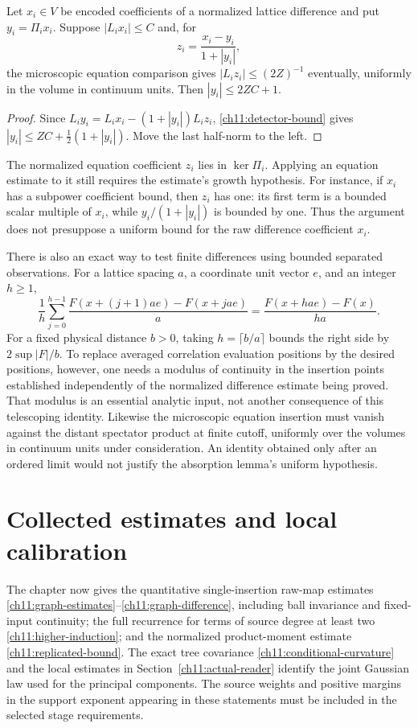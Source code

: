 \begin{lemma}
\label{ch11:absorption}
Let $x_i\in V$ be encoded coefficients of a normalized lattice
difference and put $y_i=\Pi_i x_i$. Suppose $|L_i x_i|\le C$ and,
for
\[
 z_i=\frac{x_i-y_i}{1+|y_i|},
\]
the microscopic equation comparison gives
$|L_i z_i|\le(2Z)^{-1}$ eventually, uniformly in the volume in continuum units.
Then $|y_i|\le2ZC+1$.
\end{lemma}
\begin{proof}
Since $L_i y_i=L_i x_i-(1+|y_i|)L_i z_i$,
\eqref{ch11:detector-bound} gives
$|y_i|\le ZC+\tfrac12(1+|y_i|)$.
Move the last half-norm to the left.
\end{proof}

The normalized equation coefficient $z_i$ lies in $\ker\Pi_i$.
Applying an equation estimate to it still requires the estimate's
growth hypothesis. For instance, if $x_i$ has a subpower coefficient
bound, then $z_i$ has one: its first term is a bounded scalar multiple
of $x_i$, while $y_i/(1+|y_i|)$ is bounded by one.
Thus the argument does not presuppose a uniform bound for the raw
difference coefficient $x_i$.

There is also an exact way to test finite differences using bounded
separated observations. For a lattice spacing $a$, a coordinate unit vector $e$, and an integer
$h\ge1$,
\[
 \frac1h\sum_{j=0}^{h-1}
 \frac{F(x+(j+1)ae)-F(x+jae)}a
 =\frac{F(x+hae)-F(x)}{ha}.
\]
For a fixed physical distance $b>0$, taking $h=\lceil b/a\rceil$ bounds the right side by
$2\sup|F|/b$. To replace averaged correlation evaluation positions by the desired
positions, however, one needs a modulus of continuity in the insertion points established
independently of the normalized difference estimate being proved.
That modulus is an essential analytic input, not another consequence
of this telescoping identity. Likewise the microscopic equation
insertion must vanish against the distant spectator product
at finite cutoff, uniformly over the volumes in continuum units under
consideration. An identity obtained only after an ordered limit
would not justify the absorption lemma's uniform hypothesis.

\section{Collected estimates and local calibration}
\label{ch11:collected}

The chapter now gives the quantitative single-insertion raw-map estimates
\eqref{ch11:graph-estimates}--\eqref{ch11:graph-difference},
including ball invariance and fixed-input continuity; the full
recurrence for terms of source degree at least two \eqref{ch11:higher-induction}; and the normalized
product-moment estimate \eqref{ch11:replicated-bound}.
The exact tree covariance \eqref{ch11:conditional-curvature} and the
local estimates in Section~\ref{ch11:actual-reader} identify the
joint Gaussian law used for the principal components.
The source weights and positive margins in the support exponent appearing in these
statements must be included in the selected stage requirements.

